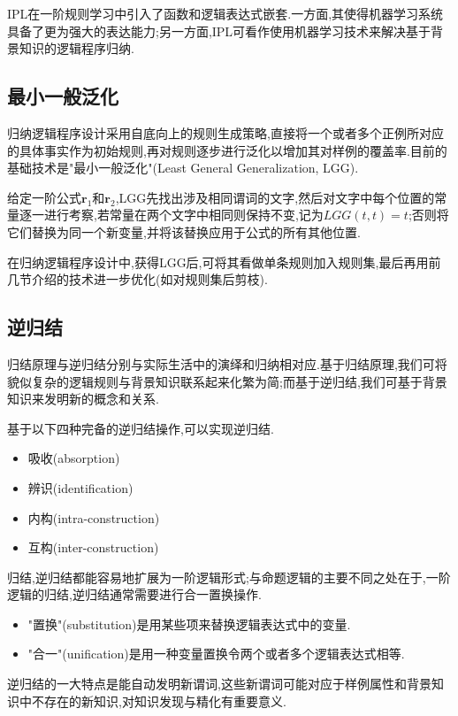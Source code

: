 IPL在一阶规则学习中引入了函数和逻辑表达式嵌套.一方面,其使得机器学习系统具备了更为强大的表达能力;另一方面,IPL可看作使用机器学习技术来解决基于背景知识的逻辑程序归纳.

\subsection{最小一般泛化}

归纳逻辑程序设计采用自底向上的规则生成策略,直接将一个或者多个正例所对应的具体事实作为初始规则,再对规则逐步进行泛化以增加其对样例的覆盖率.目前的基础技术是"最小一般泛化"(Least General Generalization, LGG).

给定一阶公式$\mathbf r_1$和$\mathbf r_2$,LGG先找出涉及相同谓词的文字,然后对文字中每个位置的常量逐一进行考察,若常量在两个文字中相同则保持不变,记为$LGG(t,t)=t$;否则将它们替换为同一个新变量,并将该替换应用于公式的所有其他位置.

在归纳逻辑程序设计中,获得LGG后,可将其看做单条规则加入规则集,最后再用前几节介绍的技术进一步优化(如对规则集后剪枝).

\subsection{逆归结}

归结原理与逆归结分别与实际生活中的演绎和归纳相对应.基于归结原理,我们可将貌似复杂的逻辑规则与背景知识联系起来化繁为简;而基于逆归结,我们可基于背景知识来发明新的概念和关系.

基于以下四种完备的逆归结操作,可以实现逆归结.
\begin{itemize}
\item 吸收(absorption)
\item 辨识(identification)
\item 内构(intra-construction)
\item 互构(inter-construction)
\end{itemize}

归结,逆归结都能容易地扩展为一阶逻辑形式;与命题逻辑的主要不同之处在于,一阶逻辑的归结,逆归结通常需要进行合一置换操作.
\begin{itemize}
\item "置换"(substitution)是用某些项来替换逻辑表达式中的变量.
\item "合一"(unification)是用一种变量置换令两个或者多个逻辑表达式相等.
\end{itemize}

逆归结的一大特点是能自动发明新谓词,这些新谓词可能对应于样例属性和背景知识中不存在的新知识,对知识发现与精化有重要意义.

